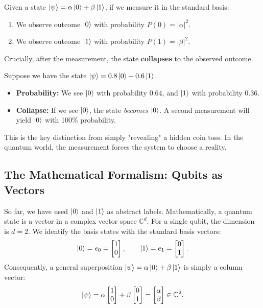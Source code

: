 \begin{definition}
Given a state $\ket{\psi} = \alpha\ket{0} + \beta\ket{1}$, if we measure it in the standard basis:
\begin{enumerate}
    \item We observe outcome $\ket{0}$ with probability $P(0) = |\alpha|^2$.
    \item We observe outcome $\ket{1}$ with probability $P(1) = |\beta|^2$.
\end{enumerate}
Crucially, after the measurement, the state \textbf{collapses} to the observed outcome.
\end{definition} 
\begin{example}
    Suppose we have the state $\ket{\psi} = 0.8\ket{0} + 0.6\ket{1}$.
    \begin{itemize}
        \item \textbf{Probability:} We see $\ket{0}$ with probability $0.64$, and $\ket{1}$ with probability $0.36$.
        \item \textbf{Collapse:} If we see $\ket{0}$, the state \textit{becomes} $\ket{0}$. A second measurement will yield $\ket{0}$ with 100\% probability.
    \end{itemize}
\end{example}

This is the key distinction from simply "revealing" a hidden coin toss. In the quantum world, the measurement forces the system to choose a reality.

\subsection{The Mathematical Formalism: Qubits as Vectors}

So far, we have used $\ket{0}$ and $\ket{1}$ as abstract labels. Mathematically, a quantum state is a vector in a complex vector space $\mathbb{C}^d$.
For a single qubit, the dimension is $d=2$. We identify the basis states with the standard basis vectors:
\[
    \ket{0} = e_0 = \begin{bmatrix} 1 \\ 0 \end{bmatrix}, \qquad
    \ket{1} = e_1 = \begin{bmatrix} 0 \\ 1 \end{bmatrix}.
\]
Consequently, a general superposition $\ket{\psi} = \alpha\ket{0} + \beta\ket{1}$ is simply a column vector:
\[
    \ket{\psi} = \alpha \begin{bmatrix} 1 \\ 0 \end{bmatrix} + \beta \begin{bmatrix} 0 \\ 1 \end{bmatrix} = \begin{bmatrix} \alpha \\ \beta \end{bmatrix} \in \mathbb{C}^2.
\]


